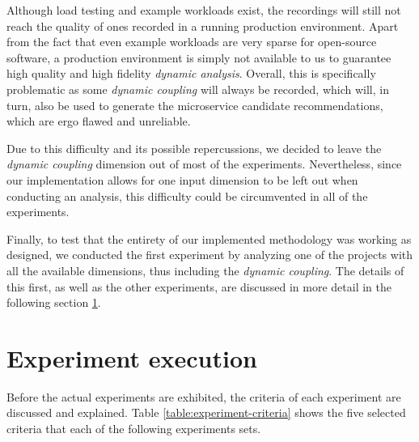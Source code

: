 \documentclass[12pt,a4paper]{report}
\begin{document}
Although load testing and example workloads exist, the recordings will still
not reach the quality of ones recorded in a running production environment.
Apart from the fact that even example workloads are very sparse for open-source
software, a production environment is simply not available to us to guarantee
high quality and high fidelity \textit{dynamic analysis}. Overall, this is
specifically problematic as some \textit{dynamic coupling} will always be
recorded, which will, in turn, also be used to generate the microservice
candidate recommendations, which are ergo flawed and unreliable.

Due to this difficulty and its possible repercussions, we decided to leave the
\textit{dynamic coupling} dimension out of most of the experiments.
Nevertheless, since our implementation allows for one input dimension to be
left out when conducting an analysis, this difficulty could be circumvented in
all of the experiments.

Finally, to test that the entirety of our implemented methodology was working
as designed, we conducted the first experiment by analyzing one of the projects
with all the available dimensions, thus including the \textit{dynamic coupling}.
The details of this first, as well as the other experiments, are discussed in
more detail in the following section \ref{sect:experiment-execution}.



\section{Experiment execution} \label{sect:experiment-execution}

Before the actual experiments are exhibited, the criteria of each experiment
are discussed and explained. Table \ref{table:experiment-criteria} shows the
five selected criteria that each of the following experiments sets.
\end{document}
